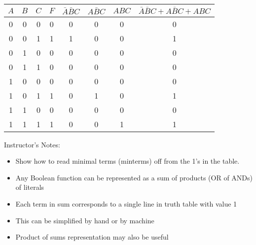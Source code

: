 \begin{frame}[fragile]

\vspace*{.5truein}

\begin{center}
\begin{tabular}{ccc|c|ccc|c}
$A$&$B$&$C$ & $F$ & $\bar A \bar B C $& $A\bar B C$&$ A B C $& $\bar A \bar B C + A\bar B C+ A B C$ \\\hline
0&0&0 & 0 & 0 & 0 & 0 & 0 \\
0&0&1 & 1 & 1 & 0 & 0 & 1 \\
0&1&0 & 0 & 0 & 0 & 0 & 0 \\
0&1&1 & 0 & 0 & 0 & 0 & 0 \\
1&0&0 & 0 & 0 & 0 & 0 & 0 \\
1&0&1 & 1 & 0 & 1 & 0 & 1 \\
1&1&0 & 0 & 0 & 0 & 0 & 0 \\
1&1&1 & 1 & 0 & 0 & 1 & 1 \\
\end{tabular}
\end{center}

\BNotes\ifnum{}
Instructor's Notes:
\begin{itemize}
\item Show how to read minimal terms (minterms) off from the 1's in the table.
\end{itemize}
\fi\ENotes
\end{frame}

\begin{frame}[fragile]
\begin{itemize}
	\item Any Boolean function can be represented as a sum of
		products (OR of ANDs) of literals
	\item Each term in sum corresponds to a single
		line in truth table with value 1
	\item This can be simplified by hand or by machine
	\item Product of sums representation may also be useful
\end{itemize}
\BNotes\ifnum{}
~%
\fi\ENotes
\end{frame}

